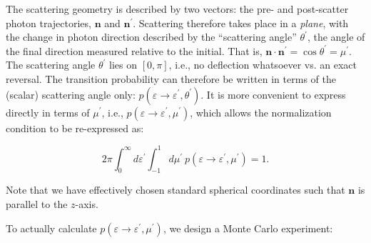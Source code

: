 \documentclass[letterpaper]{article}
\begin{document}
The scattering geometry is described by two vectors: the pre- and post-scatter photon trajectories, $\mathbf{n}$ and $\mathbf{n^\prime}$. Scattering therefore takes place in a \emph{plane}, with the change in photon direction described by the ``scattering angle'' $\theta^\prime$, the angle of the final direction measured relative to the initial. That is, $\mathbf{n} \cdot \mathbf{n^\prime} = \cos \theta^\prime = \mu^\prime$. The scattering angle $\theta^\prime$ lies on $[0, \pi]$, i.e., no deflection whatsoever vs. an exact reversal. The transition probability can therefore be written in terms of the (scalar) scattering angle only: $p(\varepsilon \to \varepsilon^\prime, \theta^\prime)$. It is more convenient to express directly in terms of $\mu^\prime$, i.e., $p(\varepsilon \to \varepsilon^\prime, \mu^\prime)$, which allows the normalization condition to be re-expressed as:

\begin{equation}
2\pi \int_0^\infty d\varepsilon^\prime \int_{-1}^1 d\mu^\prime \ p(\varepsilon \to \varepsilon^\prime, \mu^\prime) = 1.
\end{equation}

\noindent Note that we have effectively chosen standard spherical coordinates such that $\mathbf{n}$ is parallel to the $z$-axis.

To actually calculate $p (\varepsilon \to \varepsilon^\prime, \mu^\prime)$, we design a Monte Carlo experiment:
\end{document}
